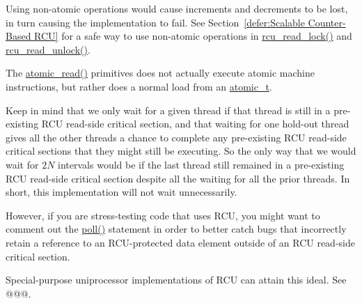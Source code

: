 	Using non-atomic operations would cause increments and decrements
	to be lost, in turn causing the implementation to fail.
	See Section~\ref{defer:Scalable Counter-Based RCU}
	for a safe way to use non-atomic operations in
	\url{rcu_read_lock()} and \url{rcu_read_unlock()}.


	The \url{atomic_read()} primitives does not actually execute
	atomic machine instructions, but rather does a normal load
	from an \url{atomic_t}.


	Keep in mind that we only wait for a given thread if that thread
	is still in a pre-existing RCU read-side critical section,
	and that waiting for one hold-out thread gives all the other
	threads a chance to complete any pre-existing RCU read-side
	critical sections that they might still be executing.
	So the only way that we would wait for $2N$ intervals
	would be if the last thread still remained in a pre-existing
	RCU read-side critical section despite all the waiting for
	all the prior threads.
	In short, this implementation will not wait unnecessarily.

	However, if you are stress-testing code that uses RCU, you
	might want to comment out the \url{poll()} statement in
	order to better catch bugs that incorrectly retain a reference
	to an RCU-protected data element outside of an RCU
	read-side critical section.


	Special-purpose uniprocessor implementations of RCU can attain
	this ideal.
	See @@@.


